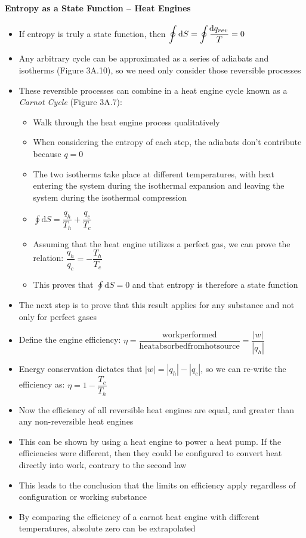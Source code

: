 \documentclass[12pt, openany, letterpaper]{memoir}
\begin{document}
\paragraph{Entropy as a State Function -- Heat Engines}
\begin{itemize}
	\item If entropy is truly a state function, then $\displaystyle\oint\mathrm{d}S = \displaystyle\oint\dfrac{\dbar q_{rev}}{T}=0$
	\item Any arbitrary cycle can be approximated as a series of adiabats and isotherms (Figure 3A.10), so we need only consider those reversible processes
	\item These reversible processes can combine in a heat engine cycle known as a \emph{Carnot Cycle} (Figure 3A.7):
	\begin{itemize}
		\item Walk through the heat engine process qualitatively
		\item When considering the entropy of each step, the adiabats don't contribute because $q=0$
		\item The two isotherms take place at different temperatures, with heat entering the system during the isothermal expansion and leaving the system during the isothermal compression
		\item $\displaystyle\oint\mathrm{d}S = \dfrac{q_h}{T_h} + \dfrac{q_c}{T_c}$
		\item Assuming that the heat engine utilizes a perfect gas, we can prove the relation: $\dfrac{q_h}{q_c} = -\dfrac{T_h}{T_c}$
		\item This proves that $\displaystyle\oint\mathrm{d}S = 0$ and that entropy is therefore a state function
	\end{itemize}
	\item The next step is to prove that this result applies for any substance and not only for perfect gases
	\item Define the engine efficiency: $\eta = \dfrac{\mathrm{work performed}}{\mathrm{heat absorbed from hot source}} = \dfrac{|w|}{|q_h|}$
	\item Energy conservation dictates that $|w| = |q_h|-|q_c|$, so we can re-write the efficiency as: $\eta = 1 - \dfrac{T_c}{T_h}$
	\item Now the efficiency of all reversible heat engines are equal, and greater than any non-reversible heat engines
	\item This can be shown by using a heat engine to power a heat pump. If the efficiencies were different, then they could be configured to convert heat directly into work, contrary to the second law
	\item This leads to the conclusion that the limits on efficiency apply regardless of configuration or working substance
	\item By comparing the efficiency of a carnot heat engine with different temperatures, absolute zero can be extrapolated
	

\end{itemize}
\end{document}

